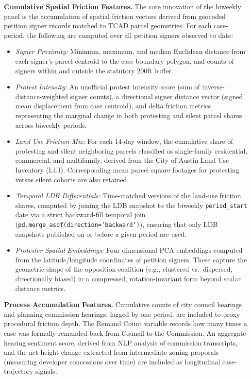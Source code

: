 \documentclass[11pt, letterpaper, oneside]{article}
\begin{document}
\textbf{Cumulative Spatial Friction Features.} The core innovation of the biweekly panel is the accumulation of spatial friction vectors derived from geocoded petition signer records matched to TCAD parcel geometries. For each case-period, the following are computed over all petition signers observed to date:

\begin{itemize}
    \item \textit{Signer Proximity:} Minimum, maximum, and median Euclidean distance from each signer's parcel centroid to the case boundary polygon, and counts of signers within and outside the statutory 200ft buffer.
    \item \textit{Protest Intensity:} An unofficial protest intensity score (sum of inverse-distance-weighted signer counts), a directional signer distance vector (signed mean displacement from case centroid), and delta friction metrics representing the marginal change in both protesting and silent parcel shares across biweekly periods.
    \item \textit{Land Use Friction Mix:} For each 14-day window, the cumulative share of protesting and silent neighboring parcels classified as single-family residential, commercial, and multifamily, derived from the City of Austin Land Use Inventory (LUI). Corresponding mean parcel square footages for protesting versus silent cohorts are also retained.
    \item \textit{Temporal LDB Differentials:} Time-matched versions of the land-use friction shares, computed by joining the LDB snapshot to the biweekly \texttt{period\_start} date via a strict backward-fill temporal join (\texttt{pd.merge\_asof(direction=`backward')}), ensuring that only LDB snapshots published on or before a given period are used.
    \item \textit{Protester Spatial Embeddings:} Four-dimensional PCA embeddings computed from the latitude/longitude coordinates of petition signers. These capture the geometric shape of the opposition coalition (e.g., clustered vs.\ dispersed, directionally biased) in a compressed, rotation-invariant form beyond scalar distance metrics.
\end{itemize}

\textbf{Process Accumulation Features.} Cumulative counts of city council hearings and planning commission hearings, lagged by one period, are included to proxy procedural friction depth. The Remand Count variable records how many times a case was formally remanded back from Council to the Commission. An aggregate hearing sentiment score, derived from NLP analysis of commission transcripts, and the net height change extracted from intermediate zoning proposals (measuring developer concessions over time) are included as longitudinal case-trajectory signals.
\end{document}
